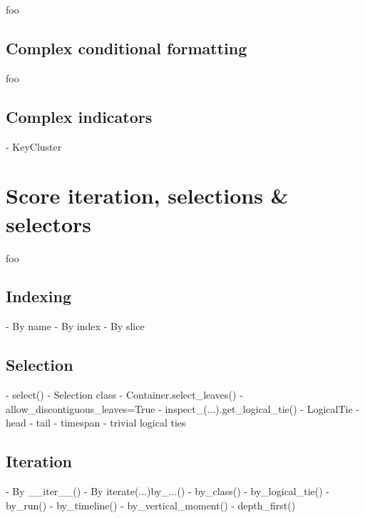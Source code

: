 foo

\subsection{Complex conditional formatting}

foo

\subsection{Complex indicators}

\begin{markdown}
-   KeyCluster
\end{markdown}

\section{Score iteration, selections \& selectors}

foo

\subsection{Indexing}
\label{ssec:indexing}

\begin{markdown}
-   By name
-   By index
-   By slice
\end{markdown}

\subsection{Selection}
\label{ssec:selection}

\begin{markdown}
-   select()
-   Selection class
-   Container.select_leaves()
    -   allow_discontiguous_leaves=True
-   inspect_(...).get_logical_tie()
-   LogicalTie
    -   head
    -   tail
    -   timespan
    -   trivial logical ties
\end{markdown}

\subsection{Iteration}
\label{ssec:iteration}

\begin{markdown}
-   By __iter__()
-   By iterate(...)by_...()
    -   by_class()
    -   by_logical_tie()
    -   by_run()
    -   by_timeline()
    -   by_vertical_moment()
    -   depth_first()
\end{markdown}

